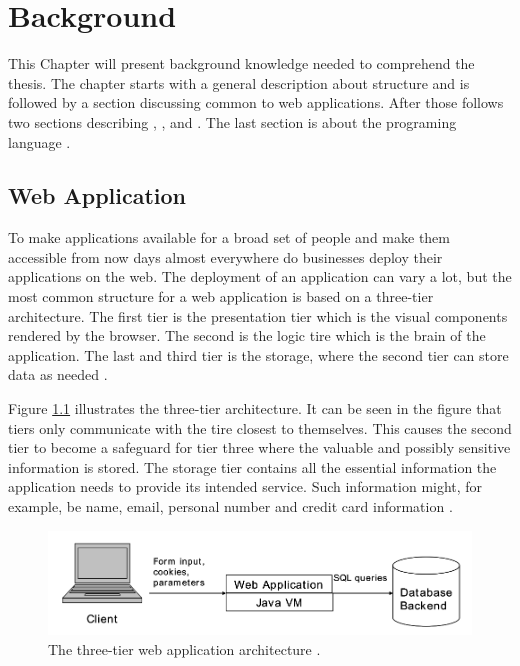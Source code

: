 \chapter{Background}
This Chapter will present background knowledge needed to comprehend the thesis. The chapter starts with a general description about \textit{} structure and is followed by a section discussing common \textit{} to web applications. After those follows two sections describing \textit{}, \textit{}, and \textit{}. The last section is about the programing language \textit{}.



\section{Web Application}
\label{WebApplication}
To make applications available for a broad set of people and make them accessible from now days almost everywhere do businesses deploy their applications on the web. The deployment of an application can vary a lot, but the most common structure for a web application is based on a three-tier architecture. The first tier is the presentation tier which is the visual components rendered by the browser. The second is the logic tire which is the brain of the application. The last and third tier is the storage, where the second tier can store data as needed \parencite{JustinClarke-Salt2009SIAa}.

Figure \ref{fig:webApplication-Haldar} illustrates the three-tier architecture. It can be seen in the figure that tiers only communicate with the tire closest to themselves. This causes the second tier to become a safeguard for tier three where the valuable and possibly sensitive information is stored. The storage tier contains all the essential information the application needs to provide its intended service. Such information might, for example, be name, email, personal number and credit card information \parencite{JustinClarke-Salt2009SIAa}.

\begin{figure}
  \centering
  \includegraphics[width=\textwidth]{images/webApplication-Haldar.png}
  \caption{The three-tier web application architecture \cite{Haldar}.}
  \label{fig:webApplication-Haldar}
\end{figure}

